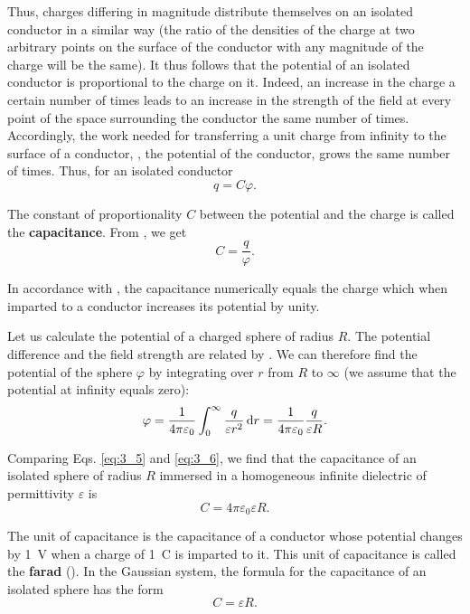 Thus, charges differing in magnitude distribute themselves on an isolated conductor in a similar way (the ratio of the densities of the charge at two arbitrary points on the surface of the conductor with any magnitude of the charge will be the same). It thus follows that the potential of an isolated conductor is proportional to the charge on it. Indeed, an increase in the charge a certain number of times leads to an increase in the strength of the field at every point of the space surrounding the conductor the same number of times. Accordingly, the work needed for transferring a unit charge from infinity to the surface of a conductor, \ie, the potential of the conductor, grows the same number of times. Thus, for an isolated conductor
\begin{equation}\label{eq:3_4}
    q = C \varphi.
\end{equation}

\noindent
The constant of proportionality $C$ between the potential and the charge is called the \textbf{capacitance}. From , we get
\begin{equation}\label{eq:3_5}
    C = \frac{q}{\varphi}.
\end{equation}

\noindent
In accordance with , the capacitance numerically equals the charge which when imparted to a conductor increases its potential by unity.

Let us calculate the potential of a charged sphere of radius $R$. The potential difference and the field strength are related by . We can therefore find the potential of the sphere $\varphi$ by integrating  over $r$ from $R$ to $\infty$ (we assume that the potential at infinity equals zero):
\begin{equation}\label{eq:3_6}
    \varphi = \frac{1}{4\pi\varepsilon_0} \int_0^{\infty} \frac{q}{\varepsilon r^2}\, \mathrm{d} r = \frac{1}{4\pi\varepsilon_0} \frac{q}{\varepsilon R}.
\end{equation}

\noindent
Comparing Eqs. \eqref{eq:3_5} and \eqref{eq:3_6}, we find that the capacitance of an isolated sphere of radius $R$ immersed in a homogeneous infinite dielectric of permittivity $\varepsilon$ is
\begin{equation}\label{eq:3_7}
    C = 4\pi\varepsilon_0 \varepsilon R.
\end{equation}

The unit of capacitance is the capacitance of a conductor whose potential changes by \SI{1}{\volt} when a charge of \SI{1}{\coulomb} is imparted to it. This unit of capacitance is called the \textbf{farad} (\si{\faraday}).
In the Gaussian system, the formula for the capacitance of an isolated sphere has the form
\begin{equation}\label{eq:3_8}
    C = \varepsilon R.
\end{equation}

